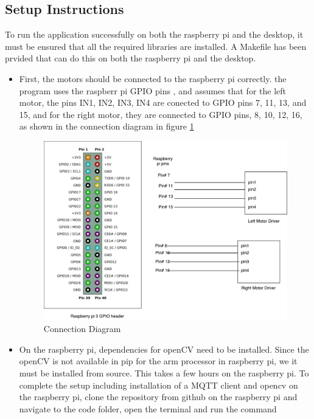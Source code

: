 \documentclass[sigconf]{acmart}
\begin{document}
%
%
\subsection{Setup Instructions}

To run the application successfully on both the raspberry pi and the desktop, it must be ensured that all the required libraries are installed. A Makefile has been prvided that can do this on both the raspberry pi and the desktop.

\begin{itemize}

\item First, the motors should be connected to the raspberry pi correctly.
the program uses the raspberr pi GPIO pins , and assumes that for the left motor, the pins IN1, IN2, IN3, IN4 are conected to GPIO pins 7, 11, 13, and 15, and for the right motor, they are connected to GPIO pins, 8, 10, 12, 16, as shown in the connection diagram in figure
\ref{f:connection}

\begin{figure}[!ht]
  \centering\includegraphics[width=\textwidth]{images/connection.pdf}
  \caption{Connection Diagram \cite{rpi-pinout}}\label{f:connection}
\end{figure}

\item On the raspberry pi, dependencies for openCV need to be installed. Since the openCV is not available in pip for the arm processor in raspberry pi, we it must be installed from source. This takes a few hours on the raspberry pi. To complete the setup including installation of a MQTT client and opencv on the raspberry pi, clone the repository from github on the raspberry pi and navigate to the code folder, open the terminal and run the command


\end{itemize}
\end{document}
